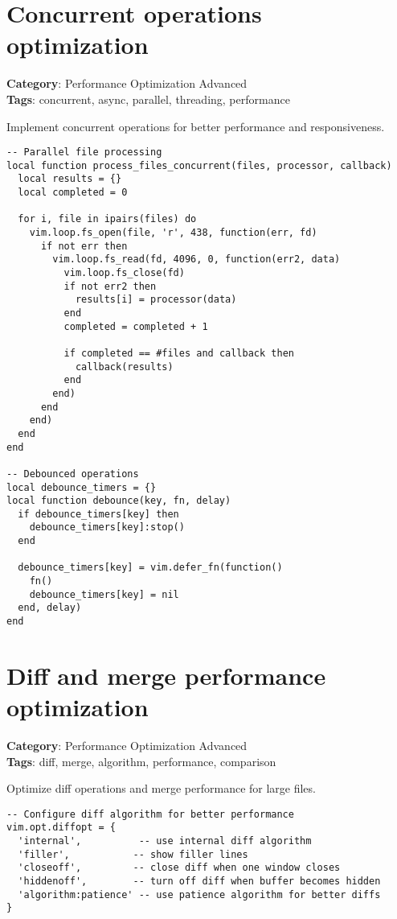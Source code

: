 {{{{{{{{{{\section{Concurrent operations optimization}

\textbf{Category}: Performance Optimization Advanced\\ \textbf{Tags}: concurrent, async, parallel, threading, performance
\vspace{0.5cm}

Implement concurrent operations for better performance and responsiveness.

\begin{Exa*}{}
\begin{Verbatim}[fontsize=\footnotesize, breaklines, breakanywhere]
-- Parallel file processing
local function process_files_concurrent(files, processor, callback)
  local results = {}
  local completed = 0
  
  for i, file in ipairs(files) do
    vim.loop.fs_open(file, 'r', 438, function(err, fd)
      if not err then
        vim.loop.fs_read(fd, 4096, 0, function(err2, data)
          vim.loop.fs_close(fd)
          if not err2 then
            results[i] = processor(data)
          end
          completed = completed + 1
          
          if completed == #files and callback then
            callback(results)
          end
        end)
      end
    end)
  end
end

-- Debounced operations
local debounce_timers = {}
local function debounce(key, fn, delay)
  if debounce_timers[key] then
    debounce_timers[key]:stop()
  end
  
  debounce_timers[key] = vim.defer_fn(function()
    fn()
    debounce_timers[key] = nil
  end, delay)
end
\end{Verbatim}
\end{Exa*}

\section{Diff and merge performance optimization}

\textbf{Category}: Performance Optimization Advanced\\ \textbf{Tags}: diff, merge, algorithm, performance, comparison
\vspace{0.5cm}

Optimize diff operations and merge performance for large files.

\begin{Exa*}{}
\begin{Verbatim}[fontsize=\footnotesize, breaklines, breakanywhere]
-- Configure diff algorithm for better performance
vim.opt.diffopt = {
  'internal',          -- use internal diff algorithm
  'filler',           -- show filler lines
  'closeoff',         -- close diff when one window closes
  'hiddenoff',        -- turn off diff when buffer becomes hidden
  'algorithm:patience' -- use patience algorithm for better diffs
}


\end{Verbatim}
\end{Exa*}}}}}}}}}}}
